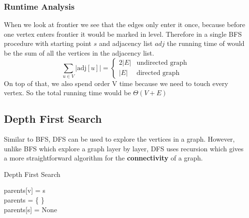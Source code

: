 \documentclass[a4paper]{article}
\begin{document}
\subsubsection*{Runtime Analysis}
When we look at frontier we see that the edges only enter it once, 
because before one vertex enters frontier it would be marked in 
level. Therefore in a single BFS procedure with starting point 
$s$ and adjacency list $adj$ the running time of would be the 
sum of all the vertices in the adjacency list.
\[ \sum_{u \in V}|\text{adj}[u]| = \begin{cases}
    2|E| & \text{undirected graph} \\
    |E| & \text{directed graph}
\end{cases} \]
On top of that, we also spend order V time because we need to 
touch every vertex. So the total running time would be 
$\Theta(V + E)$

\subsection{Depth First Search}
Similar to BFS, DFS can be used to explore the vertices in a graph. However, 
unlike BFS which explore a graph layer by layer, DFS uses recursion which gives 
a more straightforward algorithm for the \textbf{connectivity} of a graph.
%
\begin{algorithm}
    \caption{Depth First Search} \begin{algorithmic}
         
                    \State parents[v] = s
                    \State {}
                \EndIf
            \EndFor
        \EndProcedure
\\
            \State parents = \{ \}  \\ 
                 
                    \State parents[s] = None
                    \State {} \\ 
                \EndIf
            \EndFor
        \EndProcedure
    \end{algorithmic}
\end{algorithm}
%
\end{document}
